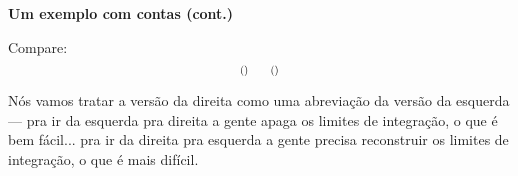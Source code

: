 \documentclass[oneside,12pt]{article}
\begin{document}
\newpage


{\bf Um exemplo com contas (cont.)}


Compare:
%
$$\scalebox{0.75}{$
  \left( \ga{2 cos(3x+4) full} \right) 
  \qquad
  \left( \ga{2 cos(3x+4) thin} \right) 
  $}
$$

Nós vamos tratar a versão da direita como uma abreviação da versão da
esquerda --- pra ir da esquerda pra direita a gente apaga os limites
de integração, o que é bem fácil... pra ir da direita pra esquerda a
gente precisa reconstruir os limites de integração, o que é mais
difícil.


\newpage


\end{document}
